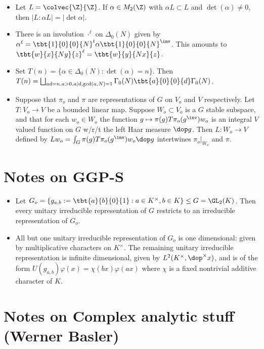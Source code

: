 \documentclass[11pt]{amsart}
\begin{document}
\begin{itemize}
   \item Let $L=\colvec{\Z}{\Z}$. If $\alpha \in M_2(\Z)$ with $\alpha L \subset L$ and $\det(\alpha) \neq 0$, then $|L:\alpha L| = |\det \alpha|$.
   \item There is an involution $\cdot ^\ell$ on $\Delta_0(N)$ given by $\alpha^\ell = \tbt{1}{0}{0}{N} ^t \alpha \tbt{1}{0}{0}{N}^\inv$. This amounts to $\tbt{w}{x}{Ny}{z}^\ell = \tbt{w}{y}{Nx}{z}$. 
   \item Set $T(n) = \{ \alpha \in \Delta_0(N) : \det(\alpha) =n\}$. Then $T(n) = \bigsqcup_{ad=n, a>0 , a\vert d, \gcd(a,N)=1} \Gamma_0(N)\tbt{a}{0}{0}{d} \Gamma_0(N)$.
   \item  Suppose that $\pi_o$ and $\pi$ are representations of $G$ on $V_o$ and $V$ respectively. Let $T:V_o \to V$ be a bounded linear map. Suppose $W_o \subset V_o$ is a $G$ stable subspace, and that for each $w_o \in W_o$ the function $g\mapsto \pi(g) T \pi_o(g^\inv) w_o$ is an integral $V$ valued function on $G$ w/r/t the left Haar measure $\dop g$. Then $L:W_o \to V$ defined by $Lw_o = \int_G \pi(g) T \pi_o(g^\inv) w_o \dop g$ intertwines $\pi_o |_{W_o}$ and $\pi$. 
\end{itemize}
\section{Notes on GGP-S}
\begin{itemize}
  \item Let $G_o= \{ g_{a,b}:=\tbt{a}{b}{0}{1}: a \in K^\times, b\in K\} \leq G=\GL_2(K)$. Then every unitary irreducible representation of $G$ restricts to an irreducible representation of $G_o$.
  \item All but one unitary irreducible representation of $G_o$ is one dimensional: given by multiplicative characters on $K^\times$. The remaining unitary irreducible representation is infinite dimensional, given by $L^2(K^\times, \dop^\times x)$, and is of the form $U(g_{a,b})\varphi(x)= \chi(bx)\varphi(ax)$ where $\chi$ is a fixed nontrivial additive character of $K$. 
\end{itemize}

\section{Notes on Complex analytic stuff (Werner Basler)}
\end{document}
